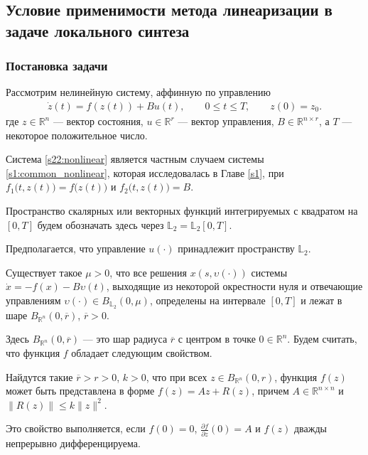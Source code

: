 \documentclass[../main.tex]{subfiles}
\begin{document}
\subsection{Условие применимости метода линеаризации в задаче локального синтеза} 

\subsubsection{Постановка задачи}

Рассмотрим нелинейную систему, аффинную по управлению
\begin{gather}\label{s22:nonlinear}
 \dot{z}(t)=f(z(t))+B u(t),\qquad 0 \leqslant t \leqslant T, \qquad z(0) = z_0.
\end{gather}
 где $ z \in \mathbb{R}^n $ --- вектор состояния, $ u \in \mathbb{R}^r $ --- вектор управления, $B \in \mathbb{R}^{n \times r}$, а $ 
T$ --- некоторое положительное число. 

Система \eqref{s22:nonlinear} является частным случаем системы \eqref{s1:common_nonlinear}, которая исследовалась в Главе \ref{s1}, при $f_1\big(t,z(t)\big) = f\big(z(t)\big)$ и $f_2\big(t,z(t)\big) = B$. 

Пространство скалярных или векторных функций интегрируемых с квадратом на $ [0,T] $ будем обозначать здесь через $ \mathbb{L}_2 = \mathbb{L}_2[0,T] $. 

Предполагается, что управление $u(\cdot)$ принадлежит пространству $\mathbb{L}_2 $.
\begin{assumption}\label{s22:as:solution_bounded}
	Существует такое $\mu > 0$, что все решения $x(s, \upsilon(\cdot))$ системы $\dot{x} = -f(x)-B\upsilon(t)$, выходящие из некоторой окрестности нуля и отвечающие управлениям $\upsilon(\cdot) \in B_{\mathbb{L}_2}(0, \mu)$, определены на интервале $[0, T]$ и лежат в шаре $ B_{\mathbb{R}^n}(0,\overline{r})$, $\overline{r} > 0$.
\end{assumption}
Здесь $ B_{\mathbb{R}^n}(0,\overline{r}) $ --- это шар радиуса $\overline{r}$ с центром в точке $0 \in \mathbb{R}^n$. 
Будем считать, что функция $f$ обладает следующим свойством.

\begin{assumption}\label{s22:as:Residial_term_bounds}
 Найдутся такие $\overline{r} > r >0$, $k>0$, что при всех $ z \in B_{\mathbb{R}^n}(0,r) $, функция $f(z)$ может быть представлена в форме $ f(z) = Az + R(z) $, причем $A \in \mathbb{R}^{n \times n}$ и $ \|R(z) \| \leqslant k \| z\|^2 $. 
\end{assumption}
Это свойство выполняется, если $f(0) = 0 $, $\frac{\partial f}{\partial z}(0) 
= A $ и $f(z)$ дважды непрерывно дифференцируема. 
\end{document}
